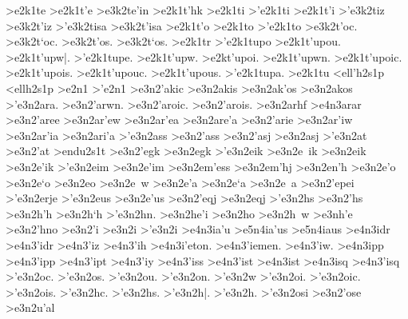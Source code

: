 {>e2k1te
>e2k1t'e
	>e3k2te'in		%
>e2k1t'hk   		%
>e2k1ti
>'e2k1ti
>e2k1t'i
	>'e3k2tiz		%
	>e3k2t'iz
	>'e3k2tisa		%
	>e3k2t'isa
>e2k1t'o
>e2k1to
>'e2k1to
	>e3k2t'oc.		%
	>e3k2t`oc.
	>e3k2t'os.
	>e3k2t`os.
>e2k1tr
>'e2k1tupo  		%
>e2k1t'upou.
>e2k1t'upw|.
>'e2k1tupe.
>e2k1t'upw.
>e2kt'upoi.
>e2k1t'upwn.
>e2k1t'upoic.
>e2k1t'upois.
>e2k1t'upouc.
>e2k1t'upous.
>'e2k1tupa.
>e2k1tu
<ell'h2s1p 		%
<ellh2s1p
>e2n1
>'e2n1
	>e3n2'akic 		%
	>e3n2akis  		%
	>e3n2ak'os 		%
	>e3n2akos
	>'e3n2ara.   		%
	>e3n2'arwn.
	>e3n2'aroic.
	>e3n2'arois.
	>e3n2arhf   		%
		>e4n3arar 		%
	>e3n2'aree  		%
	>e3n2ar'ew
	>e3n2ar'ea  		%
	>e3n2are'a
	>e3n2'arie  		%
	>e3n2ar'iw
	>e3n2ar'ia  		%
	>e3n2ari'a
	>'e3n2ass  		%
	>e3n2'ass
	>e3n2'asj
	>e3n2asj
	>'e3n2at   		%
	>e3n2'at
>endu2s1t   		%
	>e3n2'egk   		%
	>e3n2egk    		%
	>'e3n2eik   		%
	>e3n2e~ik   		%
	>e3n2eik    		%
	>e3n2e'ik   		%
	>'e3n2eim   		%
	>e3n2e'im
	>e3n2em'ess 		%
	>e3n2em'hj  		%
	>e3n2en'h   		%
	>e3n2e'o    		%
	>e3n2e`o
	>e3n2eo
	>e3n2e~w
	>e3n2e'a
	>e3n2e`a
	>e3n2e~a 
	>e3n2'epei
	>'e3n2erje  		%
	>'e3n2eus   		%
	>e3n2e'us   		%
	>e3n2'eqj   		%
	>e3n2eqj
	>'e3n2hs		%
	>e3n2'hs
	>e3n2h'h		%
	>e3n2h`h
	>'e3n2hn.		%
	>e3n2he'i  		%
	>e3n2ho
	>e3n2h~w
	>e3nh'e
	>e3n2'hno   		%
	>e3n2'i
	>e3n2i
	>'e3n2i
		>e4n3ia'u  		%
			>e5n4ia'us  		%
			>e5n4iaus 
		>e4n3idr    		%
		>e4n3'idr		%
		>e4n3'iz   		%
		>e4n3'ih   		%
		>e4n3i'eton.
		>e4n3'iemen.
		>e4n3'iw.
		>e4n3ipp   		%
		>e4n3'ipp  		%
		>e4n3'ipt  		%
		>e4n3'iy
		>e4n3'iss  		%
		>e4n3'ist  		%
		>e4n3ist
		>e4n3isq   		%
		>e4n3'isq  		%
	>'e3n2oc.		%
	>'e3n2os.
	>'e3n2ou.
	>'e3n2on.
	>'e3n2w
	>'e3n2oi.
	>'e3n2oic.
	>'e3n2ois.
	>'e3n2hc.
	>'e3n2hs.
	>'e3n2h|.
 	>'e3n2h.
	>'e3n2osi		%
	>e3n2'ose
	>e3n2u'al  		%
}
